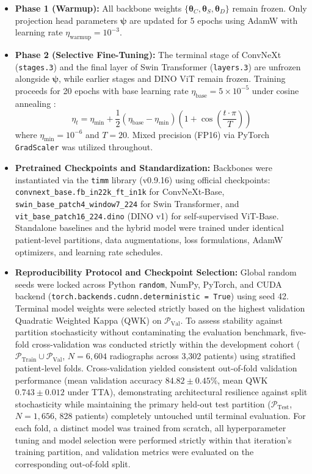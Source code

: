 \documentclass[10pt,journal]{IEEEtran}
\begin{document}
\begin{itemize}[leftmargin=*]
\item \textbf{Phase 1 (Warmup):} All backbone weights $\{\bm{\theta}_C, \bm{\theta}_S, \bm{\theta}_D\}$ remain frozen. Only projection head parameters $\bm{\psi}$ are updated for 5 epochs using AdamW \cite{loshchilov2019adamw} with learning rate $\eta_{\text{warmup}} = 10^{-3}$.
\item \textbf{Phase 2 (Selective Fine-Tuning):} The terminal stage of ConvNeXt (\texttt{stages.3}) and the final layer of Swin Transformer (\texttt{layers.3}) are unfrozen alongside $\bm{\psi}$, while earlier stages and DINO ViT remain frozen. Training proceeds for 20 epochs with base learning rate $\eta_{\text{base}} = 5 \times 10^{-5}$ under cosine annealing \cite{loshchilov2017sgdr}:
\begin{equation}
\eta_t = \eta_{\min} + \frac{1}{2}(\eta_{\text{base}} - \eta_{\min})\left(1 + \cos\left(\frac{t \cdot \pi}{T}\right)\right)
\label{eq:cosine}
\end{equation}
where $\eta_{\min} = 10^{-6}$ and $T = 20$. Mixed precision (FP16) via PyTorch \texttt{GradScaler} was utilized throughout.
\item \textbf{Pretrained Checkpoints and Standardization:} Backbones were instantiated via the \texttt{timm} library (v0.9.16) using official checkpoints: \texttt{convnext\_base.fb\_in22k\_ft\_in1k} for ConvNeXt-Base, \texttt{swin\_base\_patch4\_window7\_224} for Swin Transformer, and \texttt{vit\_base\_patch16\_224.dino} (DINO v1) for self-supervised ViT-Base. Standalone baselines and the hybrid model were trained under identical patient-level partitions, data augmentations, loss formulations, AdamW optimizers, and learning rate schedules.
\item \textbf{Reproducibility Protocol and Checkpoint Selection:} Global random seeds were locked across Python \texttt{random}, NumPy, PyTorch, and CUDA backend (\texttt{torch.backends.cudnn.deterministic = True}) using seed 42. Terminal model weights were selected strictly based on the highest validation Quadratic Weighted Kappa (QWK) on $\mathcal{P}_{\text{Val}}$. To assess stability against partition stochasticity without contaminating the evaluation benchmark, five-fold cross-validation was conducted strictly within the development cohort ($\mathcal{P}_{\text{Train}} \cup \mathcal{P}_{\text{Val}}$, $N = 6{,}604$ radiographs across 3,302 patients) using stratified patient-level folds. Cross-validation yielded consistent out-of-fold validation performance (mean validation accuracy $84.82 \pm 0.45\%$, mean QWK $0.743 \pm 0.012$ under TTA), demonstrating architectural resilience against split stochasticity while maintaining the primary held-out test partition ($\mathcal{P}_{\text{Test}}$, $N = 1{,}656$, 828 patients) completely untouched until terminal evaluation. For each fold, a distinct model was trained from scratch, all hyperparameter tuning and model selection were performed strictly within that iteration's training partition, and validation metrics were evaluated on the corresponding out-of-fold split.
\end{itemize}
\end{document}
